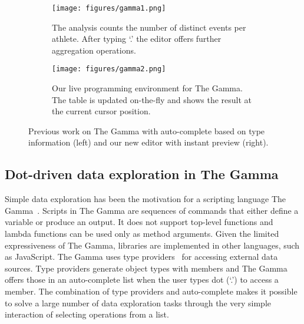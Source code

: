 \documentclass[english,crc,references=cleveref]{programming}
\theoremstyle{plain}
\theoremstyle{definition}
\begin{document}

\begin{figure}
  \begin{wide}\centering
    \begin{subfigure}{.49\linewidth}
      \texttt{[image: figures/gamma1.png]}
      \caption{The analysis counts the number of distinct events per athlete.
        After typing `.' the editor offers further aggregation operations.}
  \label{fig:gamma-dot}
    \end{subfigure}\hfill
    \begin{subfigure}{.49\linewidth}
      \texttt{[image: figures/gamma2.png]}
      \caption{Our live programming environment for The Gamma. The table is
        updated on-the-fly and shows the result at the current cursor
        position.}
  \label{fig:gamma-preview}
    \end{subfigure}
  \end{wide}
\caption{Previous work on The Gamma with auto-complete based on type information (left)
  and our new editor with instant preview (right).}
\label{fig:gamma-intro}
\end{figure}


\subsection{Dot-driven data exploration in The Gamma}
\label{sec:background-gamma}

\begin{sloppypar}
Simple data exploration has been the motivation for
a scripting language The Gamma~\cite{gamma}. Scripts in The Gamma are sequences of commands
that either define a variable or produce an output. It does not support top-level
functions and lambda functions can be used only as method arguments.
Given the limited expressiveness of The Gamma, libraries are implemented in other languages,
such as JavaScript. The Gamma uses type providers~\cite{providers-fsharp}
for accessing external data sources.
Type providers generate object types with members and The Gamma offers those in an
auto-complete list when the user types dot (`.') to access a member.
The combination of type providers and auto-complete makes it
possible to solve a large number of data exploration tasks through the very simple interaction of
selecting operations from a list.
\end{sloppypar}
\end{document}
